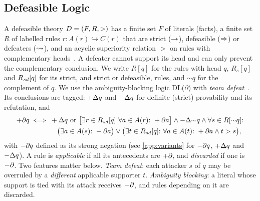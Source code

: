 \subsection{Defeasible Logic}
A defeasible theory $D=(F,R,>)$ has a finite set $F$ of literals (facts), a finite set $R$ of labelled rules $r: A(r)\hookrightarrow C(r)$ that are strict ($\rightarrow$), defeasible ($\Rightarrow$) or defeaters ($\leadsto$), and an acyclic superiority relation $>$ on rules with complementary heads~\cite{nute1994defeasible,antoniou2001representation}. A defeater cannot support its head and can only prevent the complementary conclusion. We write $R[q]$ for the rules with head $q$, $R_s[q]$ and $R_{\mathit{sd}}[q]$ for its strict, and strict or defeasible, rules, and ${\sim}q$ for the complement of $q$.
We use the ambiguity-blocking logic DL($\partial$) with \emph{team defeat}~\cite{antoniou2001representation}. Its conclusions are tagged: $+\Delta q$ and $-\Delta q$ for definite (strict) provability and its refutation, and
\begin{align*}
+\partial q \iff{}& +\Delta q \text{ or } \bigl[\exists r\in R_{\mathit{sd}}[q]\ \forall a\in A(r){:}\ +\partial a\bigr] \wedge -\Delta{\sim}q \wedge \forall s\in R[{\sim}q]{:}\\
&\quad \bigl(\exists a\in A(s){:}\ -\partial a\bigr) \vee \bigl(\exists t\in R_{\mathit{sd}}[q]{:}\ \forall a\in A(t){:}\ +\partial a \wedge t>s\bigr),
\end{align*}
with $-\partial q$ defined as its strong negation (see \cref{app:variants} for $-\partial q$, $+\Delta q$ and $-\Delta q$). A rule is \emph{applicable} if all its antecedents are $+\partial$, and \emph{discarded} if one is $-\partial$. Two features matter below. \emph{Team defeat}: each attacker $s$ of $q$ may be overruled by a \emph{different} applicable supporter $t$. \emph{Ambiguity blocking}: a literal whose support is tied with its attack receives $-\partial$, and rules depending on it are discarded.
